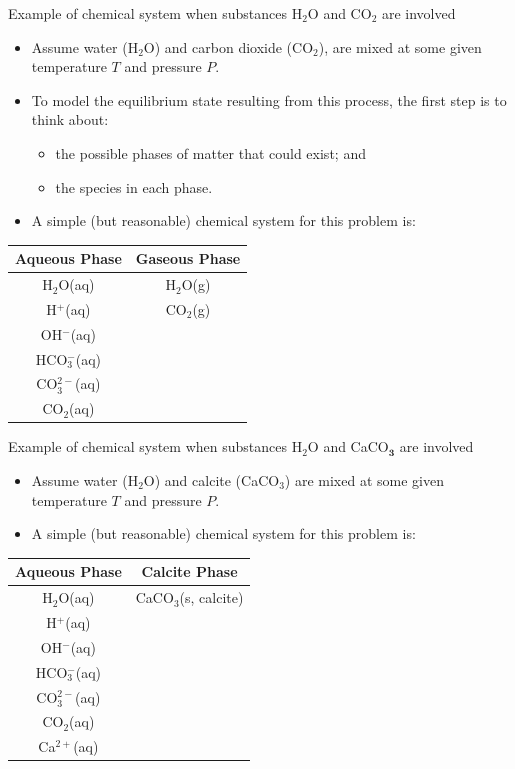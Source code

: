 \begin{frame}{Example of chemical system when substances H$_{2}$O and CO$_{2}$
are involved}

\lcol
\begin{itemize}
\item Assume water (H$_{2}$O) and carbon dioxide (CO$_{2}$), are mixed
at some given temperature $T$ and pressure $P$. 
\item To model the equilibrium state resulting from this process, the first
step is to think about:
\begin{itemize}
\item the possible phases of matter that could exist; and
\item the species in each phase. 
\end{itemize}
\end{itemize}
\rcol
\begin{itemize}
\item A simple (but reasonable) chemical system for this problem is:
\end{itemize}
\begin{center}
\begin{tabular}{cc}
\toprule 
\textbf{Aqueous Phase} & \textbf{Gaseous Phase}\tabularnewline
\midrule
H$_{2}$O(aq) & H$_{2}$O(g)\tabularnewline
H$^{+}$(aq) & CO$_{2}$(g)\tabularnewline
OH$^{-}$(aq) & \tabularnewline
HCO$_{3}^{-}$(aq) & \tabularnewline
CO$_{3}^{2-}$(aq) & \tabularnewline
CO$_{2}$(aq) & \tabularnewline
\bottomrule
\end{tabular}
\par\end{center}

\ecol
\end{frame}
%
%
\begin{frame}{Example of chemical system when substances H$_{2}$O and CaCO$_{\boldsymbol{3}}$
are involved}
\begin{itemize}
\item Assume water (H$_{2}$O) and calcite (CaCO$_{3}$) are mixed at some
given temperature $T$ and pressure $P$. 
\item A simple (but reasonable) chemical system for this problem is:
\end{itemize}
\begin{center}
\begin{tabular}{cc}
\toprule 
\multicolumn{1}{c}{\textbf{Aqueous Phase}} & \textbf{Calcite Phase}\tabularnewline
\midrule
H$_{2}$O(aq) & CaCO$_{3}$(s, calcite)\tabularnewline
H$^{+}$(aq) & \tabularnewline
OH$^{-}$(aq) & \tabularnewline
HCO$_{3}^{-}$(aq) & \tabularnewline
CO$_{3}^{2-}$(aq) & \tabularnewline
CO$_{2}$(aq) & \tabularnewline
Ca$^{2+}$(aq)  & \tabularnewline
\bottomrule
\end{tabular}
\par\end{center}

\end{frame}
